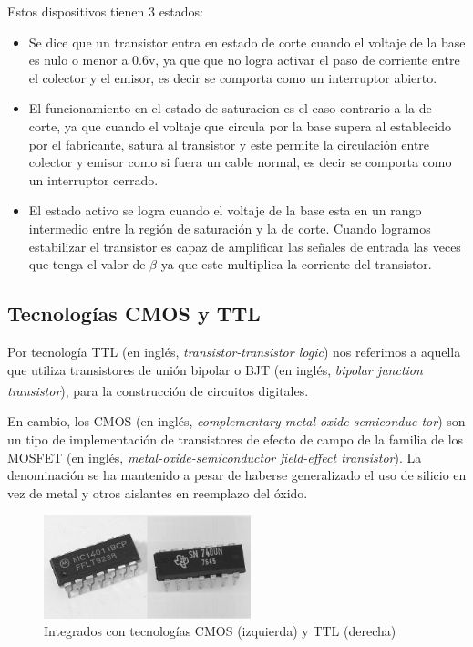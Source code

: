 \documentclass[a4paper]{article}
\let\originalcite\cite
\renewcommand{\cite}[2][]{\textsuperscript{\originalcite{#2}}}
\begin{document}
Estos dispositivos tienen 3 estados:

\begin{itemize}
    \item {
	Se dice que un transistor entra en estado de corte cuando el voltaje
	de la base es nulo o menor a 0.6v, ya que que no logra activar el paso
	de corriente entre el colector y el emisor, es decir se comporta como 
	un interruptor abierto.
    }
    \item {
        El funcionamiento en el estado de saturacion es el caso contrario a la 
	de corte, ya que cuando el voltaje que circula por la base supera al 
	establecido por el fabricante, satura al transistor y este permite la
	 circulación entre colector y emisor como si fuera un cable normal,
	 es decir se comporta como un interruptor cerrado.
    }
    \item {
        El estado activo se logra cuando el voltaje de la base esta en un rango
	intermedio entre la región de saturación y la de corte. 
	Cuando logramos estabilizar el transistor es capaz de amplificar las 
	señales de entrada las veces que tenga el valor de $\beta$ ya que este 
	multiplica la corriente del transistor.
    }    
\end{itemize}

\subsection*{Tecnologías CMOS y TTL}

Por tecnología TTL (en inglés, \textit{transistor-transistor logic})
nos referimos a aquella que utiliza transistores de unión bipolar o 
BJT (en inglés, \textit{bipolar junction transistor}), para la 
construcción de circuitos digitales\cite{bib:boylestad}.

En cambio, los CMOS (en inglés, \textit{complementary 
metal-oxide-semiconduc-tor}) son un tipo de implementación de 
transistores de efecto de campo de la familia de los MOSFET (en 
inglés, \textit{metal-oxide-semiconductor field-effect transistor}). 
La denominación se ha mantenido a pesar de haberse generalizado el 
uso de silicio en vez de metal y otros aislantes en reemplazo del 
óxido.

\begin{figure}[h]\centering
    \includegraphics[height=3cm]{transistores.png}
    \caption{Integrados con tecnologías CMOS (izquierda) y TTL 
    (derecha)}\label{fig:transistores}
\end{figure}
\end{document}
